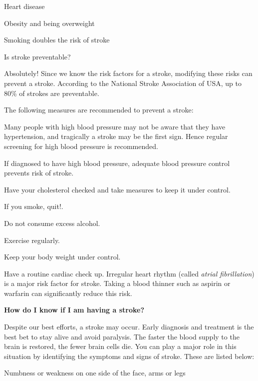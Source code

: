  \item Heart disease

 \item Obesity and being overweight

 \item Smoking doubles the risk of stroke

Is stroke preventable?

Absolutely! Since we know the risk factors for a stroke, modifying these risks can prevent a stroke. According to the National Stroke Association of USA, up to 80\% of strokes are preventable.

The following measures are recommended to prevent a stroke:

\item Many people with high blood pressure may not be aware that they have hypertension, and tragically a stroke may be the first sign. Hence regular screening for high blood pressure is recommended.

 \item If diagnosed to have high blood pressure, adequate blood pressure control prevents risk of stroke.

 \item Have your cholesterol checked and take measures to keep it under control.

 \item If you smoke, quit!.

 \item Do not consume excess alcohol.

 \item Exercise regularly.

 \item Keep your body weight under control.

 \item Have a routine cardiac check up. Irregular heart rhythm (called \textit{atrial fibrillation}) is a major risk factor for stroke. Taking a blood thinner such as aspirin or warfarin can significantly reduce this risk.

\textbf{How do I know if I am having a stroke?}

Despite our best efforts, a stroke may occur. Early diagnosis and treatment is the best bet to stay alive and avoid paralysis. The faster the blood supply to the brain is restored, the fewer brain cells die. You can play a major role in this situation by identifying the symptoms and signs of stroke. These are listed below:

\item Numbness or weakness on one side of the face, arms or legs

